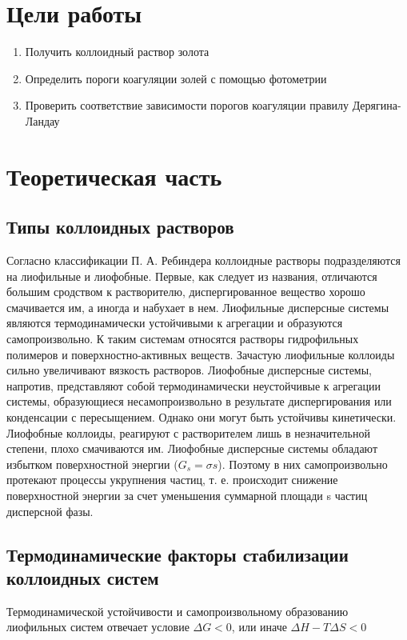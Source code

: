 \documentclass[a4paper, 12pt]{article}
\newenvironment{bottompar}{\par\vspace*{\fill}}{\clearpage}
\begin{document}
\begin{titlepage}
\begin{bottompar}
\end{bottompar}
\vfill %

\end{titlepage}

\section{Цели работы}
	\begin{enumerate}
		\item Получить коллоидный раствор золота
		
		\item Определить пороги коагуляции золей с помощью фотометрии
		
		\item Проверить соответствие зависимости порогов коагуляции правилу Дерягина-Ландау
		
	\end{enumerate}
	
\section{Теоретическая часть}
	\subsection*{Типы коллоидных растворов}
	Согласно классификации П. А. Ребиндера коллоидные растворы подразделяются на
лиофильные и лиофобные. Первые, как следует из названия, отличаются большим
сродством к растворителю, диспергированное вещество хорошо смачивается им, а иногда
и набухает в нем. Лиофильные дисперсные системы являются термодинамически
устойчивыми к агрегации и образуются самопроизвольно. К таким системам относятся
растворы гидрофильных полимеров и поверхностно-активных веществ. Зачастую
лиофильные коллоиды сильно увеличивают вязкость растворов. Лиофобные дисперсные
системы, напротив, представляют собой термодинамически неустойчивые к агрегации
системы, образующиеся несамопроизвольно в результате диспергирования или
конденсации с пересыщением. Однако они могут быть устойчивы кинетически.
Лиофобные коллоиды, реагируют с растворителем лишь в незначительной степени, плохо
смачиваются им. Лиофобные дисперсные системы обладают избытком поверхностной
энергии ($G_s = \sigma s$). Поэтому в них самопроизвольно протекают процессы укрупнения
частиц, т. е. происходит снижение поверхностной энергии за счет уменьшения суммарной
площади s частиц дисперсной фазы.

\subsection*{Термодинамические факторы стабилизации коллоидных систем}
Термодинамической устойчивости и самопроизвольному образованию лиофильных
систем отвечает условие
$\Delta G < 0$, или иначе $\Delta H - T\Delta S < 0$\\
\end{document}
